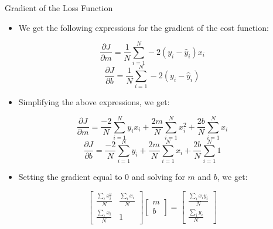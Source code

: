 \begin{frame}[allowframebreaks]{Gradient of the Loss Function}
\begin{itemize}
    \item We get the following expressions for the gradient of the cost function:
\end{itemize}

\[
\frac{\partial J}{\partial m} = \frac{1}{N} \sum_{i=1}^{N} -2(y_i - \hat{y}_i)x_i
\]
\[
\frac{\partial J}{\partial b} = \frac{1}{N} \sum_{i=1}^{N} -2(y_i - \hat{y}_i)
\]

\framebreak

\begin{itemize}
    \item Simplifying the above expressions, we get:
\end{itemize}

\[
\frac{\partial J}{\partial m} = \frac{-2}{N} \sum_{i=1}^{N} y_i x_i + \frac{2m}{N} \sum_{i=1}^{N} x_i^2 + \frac{2b}{N} \sum_{i=1}^{N} x_i
\]
\[
\frac{\partial J}{\partial b} = \frac{-2}{N} \sum_{i=1}^{N} y_i + \frac{2m}{N} \sum_{i=1}^{N} x_i + \frac{2b}{N} \sum_{i=1}^{N} 1
\]

\framebreak

\begin{itemize}
    \item Setting the gradient equal to 0 and solving for $m$ and $b$, we get:
\end{itemize}

\[
\begin{bmatrix}
\frac{\sum_i x_i^2}{N} & \frac{\sum_i x_i}{N} \\
\frac{\sum_i x_i}{N} & 1
\end{bmatrix}
\begin{bmatrix}
m \\
b
\end{bmatrix}
=
\begin{bmatrix}
\frac{\sum_i x_i y_i}{N} \\
\frac{\sum_i y_i}{N}
\end{bmatrix}
\]

\end{frame}
